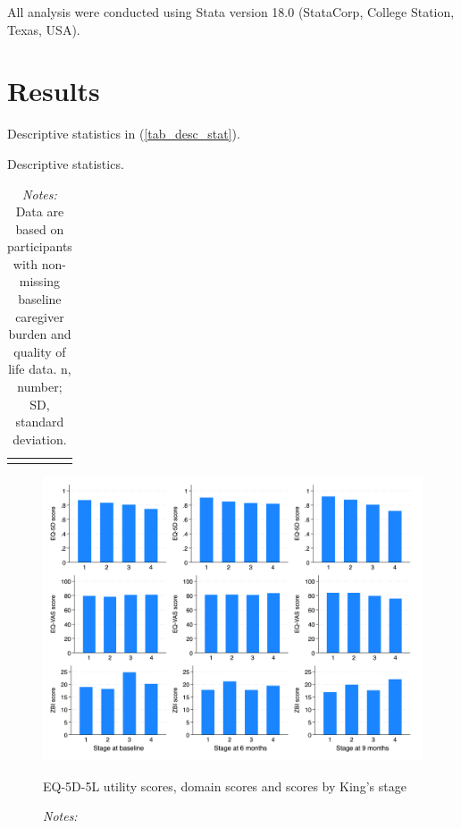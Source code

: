\documentclass[12pt]{article}
\begin{document}
All analysis were conducted using Stata version 18.0 (StataCorp, College Station, Texas, USA).

\section{Results}
Descriptive statistics in (\autoref{tab_desc_stat}). 

\hspace{1em}
\begin{table}[H]
    \centering \singlespacing \small
    \caption{Descriptive statistics.}
    \begin{tabular}{|L{5cm}|R{3.2cm}|}
        \hline
    \end{tabular}
    \label{tab_desc_stat}
    \caption*{\footnotesize \textit{Notes:} Data are based on participants with non-missing baseline caregiver burden and quality of life data. n, number; SD, standard deviation.
}
\end{table}



\hspace{1em}
\begin{figure}[H]
    \centering
    \includegraphics[width=1\linewidth]{figures/outcome-kings-stage.png}
    \caption{EQ-5D-5L utility scores, domain scores and scores by King’s stage}
    \label{fig:outcome-kings-stage}
    \caption*{\footnotesize \textit{Notes:} }
\end{figure}
\end{document}
